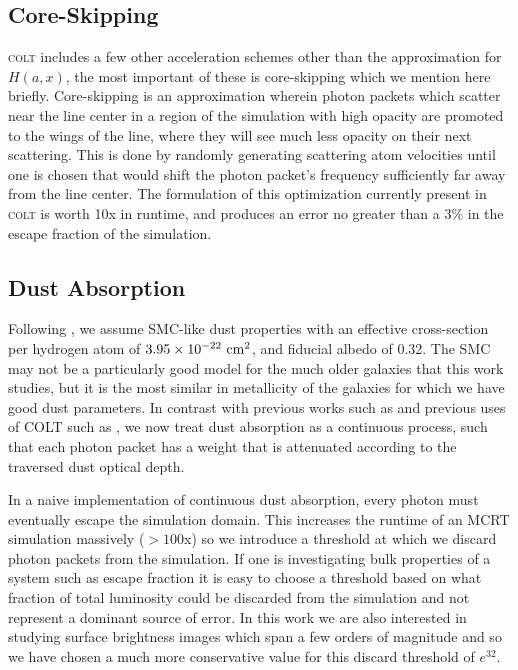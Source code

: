 \subsection{Core-Skipping}
\textsc{colt} includes a few other acceleration schemes other than the approximation for $H(a, x)$, the most important of these is core-skipping which we mention here briefly.
Core-skipping is an approximation wherein photon packets which scatter near the line center in a region of the simulation with high opacity are promoted to the wings of the line, where they will see much less opacity on their next scattering.
This is done by randomly generating scattering atom velocities until one is chosen that would shift the photon packet's frequency sufficiently far away from the line center.
The formulation of this optimization currently present in \textsc{colt} is worth 10x in runtime, and produces an error no greater than a $3\%$ in the escape fraction of the simulation.

\subsection{Dust Absorption}
Following \citet{Laursen2009}, we assume SMC-like dust properties with an effective cross-section per hydrogen atom of $3.95\times10^{-22}\ \rm{cm}^{2}$, and fiducial albedo of 0.32.
The SMC may not be a particularly good model for the much older galaxies that this work studies, but it is the most similar in metallicity of the galaxies for which we have good dust parameters.
In contrast with previous works such as \citet{Laursen2007} and previous uses of \textsc{COLT} such as \citet{Smith2015}, we now treat dust absorption as a continuous process, such that each photon packet has a weight that is attenuated according to the traversed dust optical depth.

In a naive implementation of continuous dust absorption, every photon must eventually escape the simulation domain.
This increases the runtime of an MCRT simulation massively ($>100$x) so we introduce a threshold at which we discard photon packets from the simulation.
If one is investigating bulk properties of a system such as escape fraction it is easy to choose a threshold based on what fraction of total luminosity could be discarded from the simulation and not represent a dominant source of error.
In this work we are also interested in studying surface brightness images which span a few orders of magnitude and so we have chosen a much more conservative value for this discard threshold of $e^{32}$.

